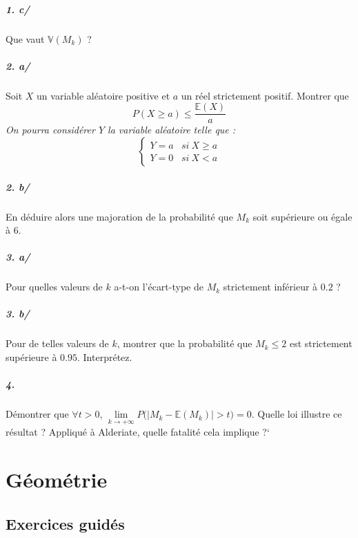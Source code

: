 		\paragraph{1. c/} Que vaut $\mathbb{V}(M_k)$ ?
		  
		\paragraph{2. a/} Soit $X$ un variable aléatoire positive et $a$ un réel strictement positif. Montrer que 
		\[
			P(X\geqslant a) \leqslant \frac{\mathbb{E}(X)}{a}
		\]
		\textit{\small On pourra considérer $Y$ la variable aléatoire telle que : 
		\[
			\left\{ \begin{array}{cc}
				Y = a & si ~ X \geqslant a \\
				Y = 0 & si ~ X < a
			\end{array}\right.
		\]}
		
		\paragraph{2. b/} En déduire alors une majoration de la probabilité que $M_k$ soit supérieure ou égale à $6$.
		
		\paragraph{3. a/} Pour quelles valeurs de $k$ a-t-on l'écart-type de $M_k$ strictement inférieur à $0.2$ ?
		
		\paragraph{3. b/} Pour de telles valeurs de $k$, montrer que la probabilité que $M_k \leqslant 2$ est strictement supérieure à $0.95$. Interprétez.
		
		\paragraph{4.} Démontrer que $\forall t>0$, $\underset{k\to +\infty}{\lim} P\big(|M_k - \mathbb{E}(M_k) | >t\big) = 0$. Quelle loi illustre ce résultat ? Appliqué à Alderiate, quelle fatalité cela implique ?`


\chapter{Géométrie}

	\section{Exercices guidés}
		
